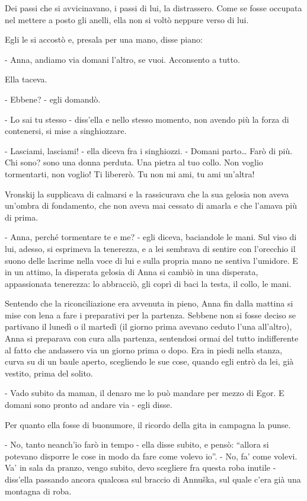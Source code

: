 Dei passi che si avvicinavano, i passi di lui, la distrassero. Come se fosse occupata nel mettere a posto gli anelli, ella non si voltò neppure verso di lui. 

Egli le si accostò e, presala per una mano, disse piano: 

- Anna, andiamo via domani l'altro, se vuoi. Acconsento a tutto. 

Ella taceva. 

- Ebbene? - egli domandò. 

- Lo sai tu stesso - diss'ella e nello stesso momento, non avendo più la forza di contenersi, si mise a singhiozzare. 

- Lasciami, lasciami! - ella diceva fra i singhiozzi. - Domani parto\ldots{} Farò di più. Chi sono? sono una donna perduta. Una pietra al tuo collo. Non voglio tormentarti, non voglio! Ti libererò. Tu non mi ami, tu ami un'altra! 

Vronskij la supplicava di calmarsi e la rassicurava che la sua gelosia non aveva un'ombra di fondamento, che non aveva mai cessato di amarla e che l'amava più di prima. 

- Anna, perché tormentare te e me? - egli diceva, baciandole le mani. Sul viso di lui, adesso, si esprimeva la tenerezza, e a lei sembrava di sentire con l'orecchio il suono delle lacrime nella voce di lui e sulla propria mano ne sentiva l'umidore. E in un attimo, la disperata gelosia di Anna si cambiò in una disperata, appassionata tenerezza: lo abbracciò, gli coprì di baci la testa, il collo, le mani. 

Sentendo che la riconciliazione era avvenuta in pieno, Anna fin dalla mattina si mise con lena a fare i preparativi per la partenza. Sebbene non si fosse deciso se partivano il lunedì o il martedì (il giorno prima avevano ceduto l'una all'altro), Anna si preparava con cura alla partenza, sentendosi ormai del tutto indifferente al fatto che andassero via un giorno prima o dopo. Era in piedi nella stanza, curva su di un baule aperto, scegliendo le sue cose, quando egli entrò da lei, già vestito, prima del solito. 

- Vado subito da maman, il denaro me lo può mandare per mezzo di Egor. E domani sono pronto ad andare via - egli disse. 

Per quanto ella fosse di buonumore, il ricordo della gita in campagna la punse. 

- No, tanto neanch'io farò in tempo - ella disse subito, e pensò: ``allora si potevano disporre le cose in modo da fare come volevo io''. - No, fa' come volevi. Va' in sala da pranzo, vengo subito, devo scegliere fra questa roba inutile - diss'ella passando ancora qualcosa sul braccio di Annuška, sul quale c'era già una montagna di roba. 

